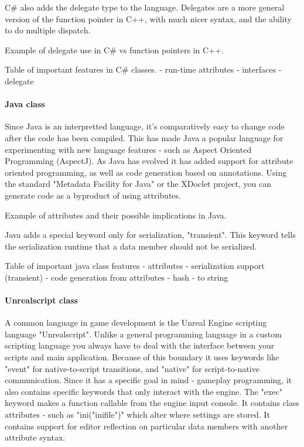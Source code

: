 C\# also adds the delegate type to the language.  Delegates are a more general version of the 
function pointer in C++, with much nicer syntax, and the ability to do multiple dispatch.

Example of delegate use in C\# vs function pointers in C++.

Table of important features in C\# classes.
- run-time attributes
- interfaces
- delegate

\paragraph{Java class}

Since Java is an interpretted language, it's comparatively easy to
change code after the code has been compiled.  This has made Java a popular
language for experimenting with new language features - such as Aspect Oriented
Programming (AspectJ).  As Java has evolved it has added support for attribute
oriented programming, as well as code generation based on annotations.  Using
the standard "Metadata Facility for Java" or the XDoclet project, you can generate code as 
a byproduct of using attributes.

Example of attributes and their possible implications in Java.

Java adds a special keyword only for serialization, "transient".  This
keyword tells the serialization runtime that a data member should not 
be serialized.

Table of important java class features
- attributes
- serialization support (transient)
- code generation from attributes
- hash
- to string

\paragraph{Unrealscript class}

A common language in game development is the Unreal Engine scripting language "Unrealscript".
Unlike a general programming language in a custom scripting language you always have to deal with
the interface between your scripts and main application.  Because of this boundary it uses keywords like
"event" for native-to-script transitions, and "native" for script-to-native communication.  Since
it has a specific goal in mind - gameplay programming, it also contains specific keywords that only
interact with the engine.  The "exec" keyword makes a function callable from the engine input console.
It contains class attributes - such as "ini("inifile")" which alter where settings are stored.  
It contains support for editor reflection on particular data members with another attribute syntax.


